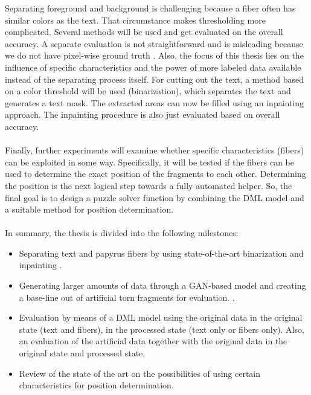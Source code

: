 \documentclass[12pt,a4paper]{article}
\begin{document}
Separating foreground and background is challenging because a fiber often has similar colors as the text. That circumstance makes thresholding more complicated. Several methods will be used and get evaluated on the overall accuracy. A separate evaluation is not straightforward and is misleading because we do not have pixel-wise ground truth \cite{Tensmeyer20}. Also, the focus of this thesis lies on the influence of specific characteristics and the power of more labeled data available instead of the separating process itself. For cutting out the text,  a method based on a color threshold will be used (binarization), which separates the text and generates a text mask. 
The extracted areas can now be filled using an inpainting \cite{Ballester00} approach. The inpainting procedure is also just evaluated based on overall accuracy. 
\\\\
Finally, further experiments will examine whether specific characteristics (fibers) can be exploited in some way. Specifically, it will be tested if the fibers can be used to determine the exact position of the fragments to each other. Determining the position is the next logical step towards a fully automated helper. So, the final goal is to design a puzzle solver function by combining the DML model and a suitable method for position determination. 
\\\\
In summary, the thesis is divided into the following milestones:

\begin{itemize}
	\item Separating text and papyrus fibers by using state-of-the-art binarization \cite{Tensmeyer20} and inpainting \cite{Liu18Impainting}.
	
	\item Generating larger amounts of data through a GAN-based model and creating a base-line out of artificial torn fragments for evaluation.  \cite{Goodfellow14, Tamrin21}.
	
	\item  Evaluation by means of a DML model using the original data in the original state (text and fibers), in the processed state (text only or fibers only). Also, an evaluation of the artificial data together with the original data in the original state and processed state.
	
	\item Review of the state of the art on the possibilities of using certain characteristics for position determination.      	      	      
\end{itemize}
		
\end{document}
